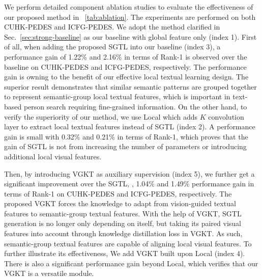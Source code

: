 We perform detailed component ablation studies to evaluate the effectiveness of our proposed method in \tablename~\ref{tab:ablation}. The experiments are performed on both CUHK-PEDES and ICFG-PEDES. 
We adopt the method clarified in Sec.~\ref{sec:strong-baseline} as our baseline with global feature only (index 1). 
First of all, when adding the proposed SGTL into our baseline (index 3), a performance gain of 1.22\% and 2.16\% in terms of Rank-1 is observed over the baseline on CUHK-PEDES and ICFG-PEDES, respectively. The performance gain is owning to the benefit of our effective local textual learning design.
The superior result demonstrates that  similar semantic patterns are grouped
together to represent semantic-group local textual features, which is important in text-based person search requiring fine-grained information.
On the other hand, to verify the superiority of our method, we use Local which adds $K$ convolution layer to extract local textual features instead of SGTL (index 2). A performance gain is small with 0.32\% and 0.21\% in terms of Rank-1,
which proves that the gain of SGTL is not from increasing the number of parameters or introducing additional local visual features.


Then, by introducing VGKT as auxiliary supervision (index 5), we further get a significant improvement over the SGTL, \eg, 1.04\% and 1.49\% performance gain in terms of Rank-1 on CUHK-PEDES and ICFG-PEDES, respectively. 
The proposed VGKT forces the knowledge to adapt from vision-guided textual features to semantic-group textual features. With the help of VGKT,
SGTL generation is no longer only depending on itself, but taking its paired visual features into account through knowledge distillation loss in VGKT. As such, semantic-group textual features are capable of aligning local visual features.
To further illustrate its effectiveness, We add VGKT built upon Local (index 4).
There is also a significant performance gain beyond Local, which verifies that our VGKT is a versatile module.








